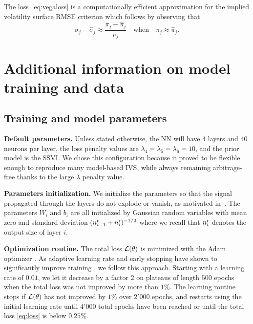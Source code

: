The loss~\eqref{eq:vegaloss} is a computationally efficient approximation for the implied volatility surface RMSE criterion which follows by observing that
\[
\sigma_{j}-\hat{\sigma}_{j} \approx \frac{\pi_{j}-\hat{\pi}_{j}}{\nu_{j}} \quad \text{when} \quad \pi_{j}\approx\hat{\pi}_{j}.
\]



\section{Additional information on model training and data}\label{sec:addit}

\subsection{Training and model parameters} \label{sec:train}

\textbf{Default parameters.}
Unless stated otherwise, the NN will have 4 layers and 40 neurons per layer, the loss penalty values are $\lambda_4=\lambda_5=\lambda_6=10$, and the prior model is the SSVI.
We chose this configuration because it proved to be flexible enough to reproduce many model-based IVS, while always remaining arbitrage-free thanks to the large $\lambda$ penalty value.

\textbf{Parameters initialization.}
We initialize the parameters so that the signal propagated through the layers do not explode or vanish, as motivated in~\cite{glorot2010understanding}.
The parameters $W_{i}$ and $b_i$ are all initialized by Gaussian random variables with mean zero and standard deviation $(n^{\rm r}_{i-1} + n^{\rm r}_{i})^{-1/2}$ where we recall that $n^{\rm r}_{i}$ denotes the output size of layer $i$.

\textbf{Optimization routine.}
The total loss ${\mathcal L}(\theta)$ is minimized with the Adam optimizer \citep{kingma2014adam}. 
As adaptive learning rate and early stopping have shown to significantly improve training \citep{haykin2009neural, hagan1994training, sutskever2013importance, caruana2001overfitting, prechelt1998early, hinton2015distilling}, we follow this approach.
Starting with a learning rate of $0.01$, we let it decrease by a factor $2$ on plateaus of length $500$ epochs when the total loss was not improved by more than $1\%$.
The learning routine stops if ${\mathcal L}(\theta)$ has not improved by $1\%$ over $2'000$ epochs, and restarts using the initial learning rate until $4'000$ total epochs have been reached or until the total loss \eqref{eq:loss} is below $0.25\%$.

